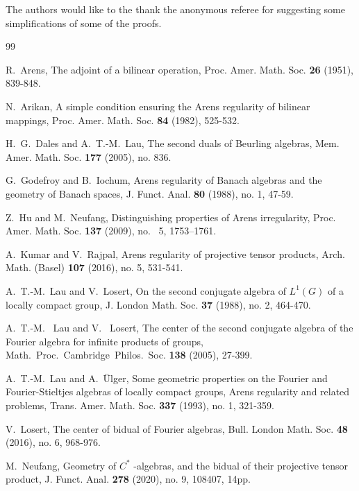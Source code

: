 \documentclass[a4]{amsart}
\theoremstyle{cupthm}
\theoremstyle{cupdefn}
\theoremstyle{cuprem}
\numberwithin{equation}{section}
\begin{document}
 The authors would like to the thank
the anonymous referee for suggesting some simplifications of some of
the proofs.

\begin{thebibliography}{99}

 R.~Arens, The adjoint of a bilinear operation, Proc.
  Amer. Math.  Soc. {\bf 26} (1951), 839-848.
	
	 N.~Arikan, A simple condition ensuring the
          Arens regularity of bilinear mappings, Proc. Amer.
          Math. Soc. {\bf 84} (1982), 525-532.

       H.~G.~Dales and A.~T.-M.~Lau, The second duals of
        Beurling algebras, Mem. Amer. Math. Soc. {\bf 177} (2005),
        no. 836.
        
 G.~Godefroy and B.~Iochum, Arens regularity of Banach
	algebras and the geometry of Banach spaces, J. Funct. Anal. {\bf 80}
	(1988), no. 1, 47-59.

 Z.~Hu and M.~Neufang, Distinguishing properties of Arens
  irregularity, Proc. Amer. Math. Soc. {\bf 137} (2009), no.~ 5,
  1753–1761.

    
 A.~Kumar and V.~Rajpal, Arens regularity of projective
  tensor products, Arch. Math. (Basel) {\bf 107} (2016), no. 5,
  531-541.

   A.~T.-M.~Lau and  V.~Losert, On the second conjugate
  algebra of $L^1(G)$ of a locally compact group, J. London
  Math. Soc. {\bf 37} (1988), no. 2, 464-470.

 A.~T.-M.~ Lau and  V.~ Losert, The center of the second
  conjugate algebra of the Fourier algebra for infinite products of
  groups, Math.~Proc.~Cambridge~Philos.~Soc. {\bf 138} (2005), 27-399.


 A.~T.-M.~Lau and A.~\"Ulger, Some geometric properties on
	the Fourier and Fourier-Stieltjes algebras of locally compact
	groups, Arens regularity and related problems,
	Trans. Amer. Math. Soc. {\bf 337} (1993), no. 1, 321-359.

   V.~Losert, The center of bidual of Fourier algebras,
  Bull. London Math. Soc. {\bf 48} (2016), no. 6, 968-976.


        
       M.~Neufang, Geometry of $C^*$ -algebras, and
        the bidual of their projective tensor product,
        J. Funct. Anal. {\bf 278} (2020), no. 9, 108407, 14pp.
	

\end{thebibliography}
\end{document}
